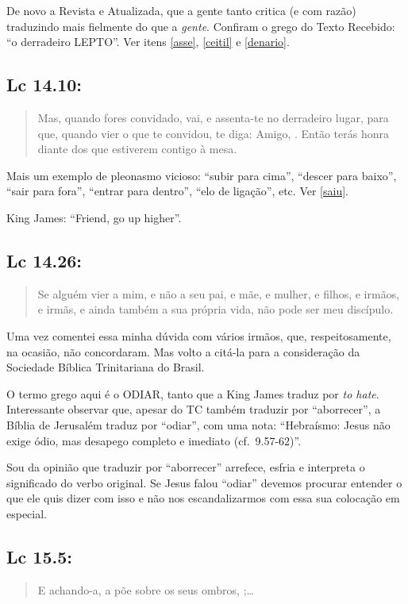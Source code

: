 De novo a Revista e Atualizada, que a gente tanto critica (e com
razão) traduzindo mais fielmente do que a \emph{gente}. Confiram o
grego do Texto Recebido: ``o derradeiro LEPTO''. Ver itens \ref{asse}, \ref{ceitil} e \ref{denario}.


\subsection{Lc 14.10:}
\begin{quote}
    \small
Mas, quando fores convidado, vai, e assenta-te no
derradeiro lugar, para que, quando vier o que te convidou, te diga:
Amigo, . Então terás honra diante dos que estiverem
contigo à mesa.
\end{quote}

Mais um exemplo de pleonasmo vicioso: ``subir para cima'', ``descer
para baixo'', ``sair para fora'', ``entrar para dentro'', ``elo de
ligação'', etc. Ver \ref{saiu}.

King James: ``Friend, go up higher''.


\subsection{Lc 14.26:}

\begin{quote}
    \small
Se alguém vier a mim, e não  a seu pai,
e mãe, e mulher, e filhos, e irmãos, e irmãs, e ainda também a sua própria
vida, não pode ser meu discípulo.
\end{quote}

Uma vez comentei essa minha dúvida com vários irmãos, que,
respeitosamente, na ocasião, não concordaram. Mas volto a citá-la
para a consideração da Sociedade Bíblica Trinitariana do Brasil.

O termo grego aqui é o ODIAR, tanto que a King James traduz por
\textit{to hate}. Interessante observar que, apesar do TC também traduzir por
``aborrecer'', a Bíblia de Jerusalém traduz por ``odiar'', com uma
nota: ``Hebraísmo: Jesus não exige ódio, mas desapego completo e
imediato (cf.~9.57-62)''.

Sou da opinião que traduzir por ``aborrecer'' arrefece, esfria e interpreta o significado do verbo original. Se Jesus falou ``odiar'' devemos procurar entender o que ele quis dizer com isso e não nos escandalizarmos com essa sua colocação em especial.

\subsection{Lc 15.5:}
\begin{quote}
    \small
E achando-a, a põe sobre os seus ombros, ;\ldots
\end{quote}

